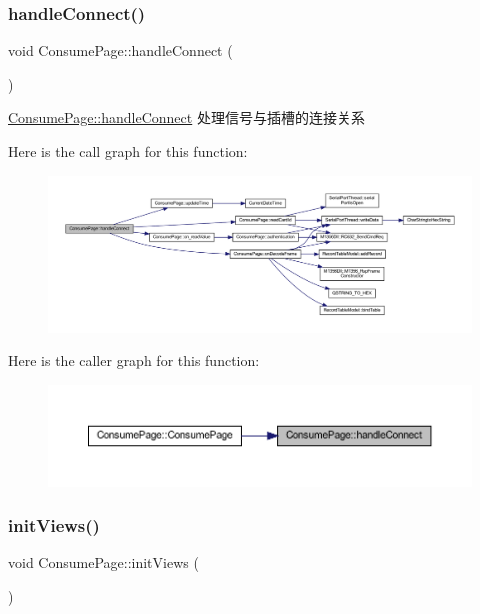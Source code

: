 \subsubsection{\texorpdfstring{handleConnect()}{handleConnect()}}
{\footnotesize\ttfamily void Consume\+Page\+::handle\+Connect (\begin{DoxyParamCaption}{ }\end{DoxyParamCaption})\hspace{0.3cm}{\ttfamily [private]}}



\mbox{\hyperlink{class_consume_page_add3af5a3661b2a7172bddb5fa81452a0}{Consume\+Page\+::handle\+Connect}} 处理信号与插槽的连接关系 

Here is the call graph for this function\+:
\nopagebreak
\begin{figure}[H]
\begin{center}
\leavevmode
\includegraphics[width=350pt]{class_consume_page_add3af5a3661b2a7172bddb5fa81452a0_cgraph}
\end{center}
\end{figure}
Here is the caller graph for this function\+:
\nopagebreak
\begin{figure}[H]
\begin{center}
\leavevmode
\includegraphics[width=350pt]{class_consume_page_add3af5a3661b2a7172bddb5fa81452a0_icgraph}
\end{center}
\end{figure}
\mbox{\label{class_consume_page_a53f5ce5e4192a56330fac399aa43c199}} 
\subsubsection{\texorpdfstring{initViews()}{initViews()}}
{\footnotesize\ttfamily void Consume\+Page\+::init\+Views (\begin{DoxyParamCaption}{ }\end{DoxyParamCaption})\hspace{0.3cm}{\ttfamily [private]}}



